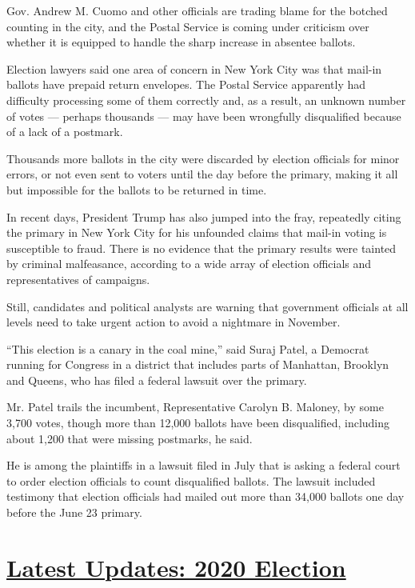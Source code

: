 Gov. Andrew M. Cuomo and other officials are trading blame for the
botched counting in the city, and the Postal Service is coming under
criticism over whether it is equipped to handle the sharp increase in
absentee ballots.

Election lawyers said one area of concern in New York City was that
mail-in ballots have prepaid return envelopes. The Postal Service
apparently had difficulty processing some of them correctly and, as a
result, an unknown number of votes --- perhaps thousands --- may have
been wrongfully disqualified because of a lack of a postmark.

Thousands more ballots in the city were discarded by election officials
for minor errors, or not even sent to voters until the day before the
primary, making it all but impossible for the ballots to be returned in
time.

In recent days, President Trump has also jumped into the fray,
repeatedly citing the primary in New York City for his unfounded claims
that mail-in voting is susceptible to fraud. There is no evidence that
the primary results were tainted by criminal malfeasance, according to a
wide array of election officials and representatives of campaigns.

Still, candidates and political analysts are warning that government
officials at all levels need to take urgent action to avoid a nightmare
in November.

``This election is a canary in the coal mine,'' said Suraj Patel, a
Democrat running for Congress in a district that includes parts of
Manhattan, Brooklyn and Queens, who has filed a federal lawsuit over the
primary.

Mr. Patel trails the incumbent, Representative Carolyn B. Maloney, by
some 3,700 votes, though more than 12,000 ballots have been
disqualified, including about 1,200 that were missing postmarks, he
said.

He is among the plaintiffs in a lawsuit filed in July that is asking a
federal court to order election officials to count disqualified ballots.
The lawsuit included testimony that election officials had mailed out
more than 34,000 ballots one day before the June 23 primary.

\hypertarget{latest-updates-2020-election}{%
\section{\texorpdfstring{\href{https://www.nytimes3xbfgragh.onion/2020/08/04/us/elections/primary-election-michigan-arizona-kansas.html?action=click\&pgtype=Article\&state=default\&region=MAIN_CONTENT_1\&context=storylines_live_updates}{Latest
Updates: 2020
Election}}{Latest Updates: 2020 Election}}\label{latest-updates-2020-election}}

